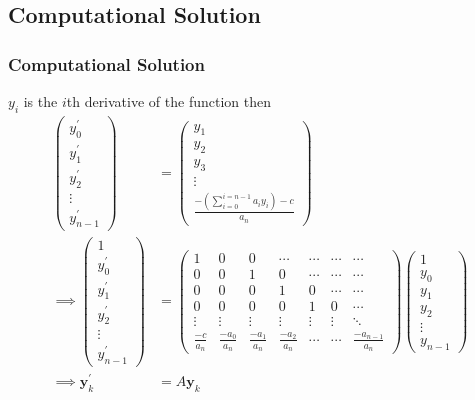 \documentclass{beamer}
\providecommand{\brak}[1]{\ensuremath{\left(#1\right)}}
\theoremstyle{remark}
\newcommand{\myvec}[1]{\ensuremath{\begin{pmatrix}#1\end{pmatrix}}}
\let\vec\mathbf
\numberwithin{equation}{section}
\begin{document}
\subsection{Computational Solution}
\begin{frame}[fragile]
\frametitle{Computational Solution}
$y_{i}$ is the $i$th derivative of the function then
\begin{align}
    \myvec{y_{0}^{\prime}\\y_{1}^{\prime}\\y_{2}^{\prime}\\ \vdots\\y^{\prime}_{n-1}}&=\myvec{y_{1}\\y_{2}\\y_{3}\\ \vdots\\ \frac{-\brak{\sum_{i=0}^{i=n-1}a_iy_i}-c}{a_n}}\\
    \implies  \myvec{1\\y_{0}^{\prime}\\y_{1}^{\prime}\\y_{2}^{\prime}\\ \vdots\\y^{\prime}_{n-1}}&=\myvec{1&0&0&\cdots&\cdots&\cdots&\cdots\\0&0&1&0&\cdots&\cdots&\cdots\\0&0&0&1&0&\cdots&\cdots\\0&0&0&0&1&0&\cdots\\ \vdots&\vdots&\vdots&\vdots&\vdots&\vdots&\ddots\\ \frac{-c}{a_n}&\frac{-a_{0}}{a_n}&\frac{-a_{1}}{a_n}&\frac{-a_{2}}{a_n}&\cdots&\cdots&\frac{-a_{n-1}}{a_n}}\myvec{1\\y_{0}\\y_{1}\\y_{2}\\ \vdots\\y_{n-1}}\\
    \implies \vec{y}_k^{\prime}&=A\vec{y}_k
\end{align}
\end{frame}
\end{document}
